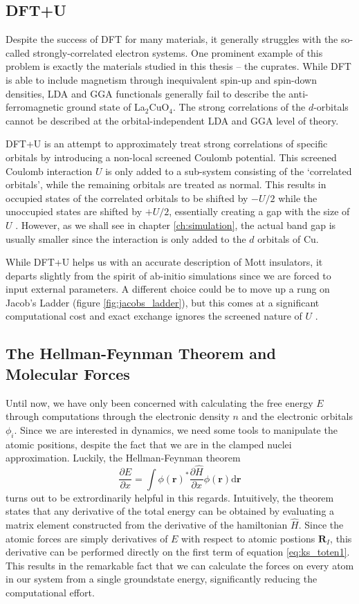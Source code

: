 \subsection{DFT+U}\label{sec:ldau}
Despite the success of DFT for many materials, it generally struggles with the so-called strongly-correlated electron systems. One prominent example of this problem is exactly the materials studied in this thesis -- the cuprates. While DFT is able to include magnetism through inequivalent spin-up and spin-down densities, LDA and GGA functionals generally fail to describe the anti-ferromagnetic ground state of La$_2$CuO$_4$. The strong correlations of the $d$-orbitals cannot be described at the orbital-independent LDA and GGA level of theory.

DFT+U is an attempt to approximately treat strong correlations of specific orbitals by introducing a non-local screened Coulomb potential. This screened Coulomb interaction $U$ is only added to a sub-system consisting of the `correlated orbitals', while the remaining orbitals are treated as normal. This results in occupied states of the correlated orbitals to be shifted by $-U/2$ while the unoccupied states are shifted by $+U/2$, essentially creating a gap with the size of $U$ \cite{Anisimov1997}. However, as we shall see in chapter \ref{ch:simulation}, the actual band gap is usually smaller since the interaction is only added to the $d$ orbitals of Cu.

While DFT+U helps us with an accurate description of Mott insulators, it departs slightly from the spirit of ab-initio simulations since we are forced to input external parameters. A different choice could be to move up a rung on Jacob's Ladder (figure \ref{fig:jacobs_ladder}), but this comes at a significant computational cost and exact exchange ignores the screened nature of $U$ \cite{Anisimov1997}.

\subsection{The Hellman-Feynman Theorem and Molecular Forces}
Until now, we have only been concerned with calculating the free energy $E$ through computations through the electronic density $n$ and the electronic orbitals $\phi_i$. Since we are interested in dynamics, we need some tools to manipulate the atomic positions, despite the fact that we are in the clamped nuclei approximation. Luckily, the Hellman-Feynman theorem \cite{Feynman1939}
%
\[ \frac{\partial E}{\partial x} = \int \phi(\bm{r})^* \frac{\partial \hat{H}}{\partial x} \phi(\bm{r}) \mathrm{d}\bm{r} \]
%
turns out to be extrordinarily helpful in this regards. Intuitively, the theorem states that any derivative of the total energy can be obtained by evaluating a matrix element constructed from the derivative of the hamiltonian $\hat{H}$. Since the atomic forces are simply derivatives of $E$ with respect to atomic postions $\bm{R}_I$, this derivative can be performed directly on the first term of equation \eqref{eq:ks_toten1}. This results in the remarkable fact that we can calculate the forces on every atom in our system from a single groundstate energy, significantly reducing the computational effort.

